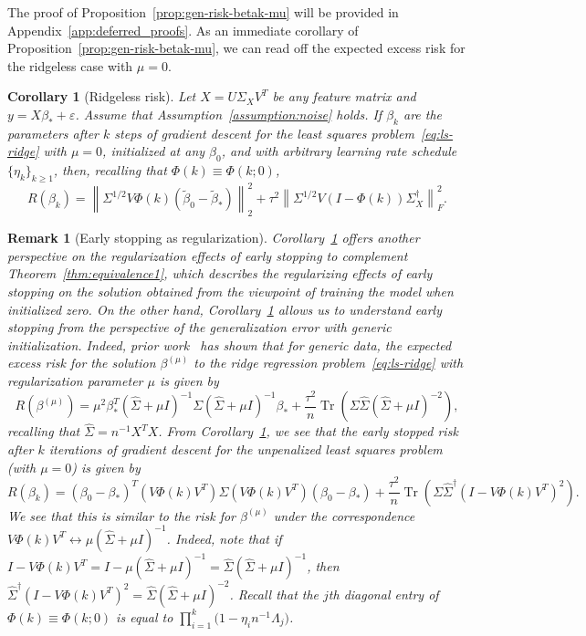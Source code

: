 \documentclass[11pt]{article}
\newtheorem{corollary}{Corollary}
\newtheorem{remark}{Remark}
\DeclareMathOperator{\Tr}{Tr}
\begin{document}
The proof of Proposition~\ref{prop:gen-risk-betak-mu} will be provided in Appendix~\ref{app:deferred_proofs}.
As an immediate corollary of Proposition~\ref{prop:gen-risk-betak-mu}, we can read off the expected excess risk for the ridgeless case with $\mu = 0$.

\begin{corollary}[Ridgeless risk] \label{cor:gen-risk-betak}
Let $X = U \Sigma_X V^T$ be any feature matrix and $y = X \beta_* + \varepsilon$. Assume that Assumption~\ref{assumption:noise} holds. If $\beta_k$ are the parameters after $k$ steps of gradient descent for the least squares problem~\eqref{eq:ls-ridge} with $\mu = 0$, initialized at any $\beta_0$, and with arbitrary learning rate schedule $\{ \eta_k\}_{k \geq 1}$, then, recalling that $\Phi(k) \equiv \Phi(k; 0)$,
\[
    R(\beta_k) = \left\|\Sigma^{1/2}V\Phi(k)(\tilde{\beta}_0 - \tilde{\beta}_*)\right\|_2^2 + \tau^2\left\|\Sigma^{1/2}V(I - \Phi(k))\Sigma_X^\dagger \right\|_F^2.
\]
\end{corollary}

\begin{remark}[Early stopping as regularization] Corollary~\ref{cor:gen-risk-betak} offers another perspective on the regularization effects of early stopping to complement Theorem~\ref{thm:equivalence1}, which describes the regularizing effects of early stopping on the solution obtained from the viewpoint of training the model when initialized zero. On the other hand, Corollary~\ref{cor:gen-risk-betak} allows us to understand early stopping from the perspective of the generalization error with generic initialization. Indeed, prior work~\cite{DobribanWager2018, cheng2024dimension} has shown that for generic data, the expected excess risk for the solution $\beta^{(\mu)}$ to the ridge regression problem~\eqref{eq:ls-ridge} with regularization parameter $\mu$ is given by 
\[
    R(\beta^{(\mu)}) = \mu^2 \beta_*^T(\hat{\Sigma} + \mu I)^{-1}\Sigma (\hat{\Sigma} + \mu I)^{-1} \beta_* + \frac{\tau^2}{n}\Tr\left(\Sigma \hat{\Sigma} (\hat{\Sigma} + \mu I)^{-2}\right),
\]
recalling that $\hat{\Sigma} = n^{-1} X^T X$.
From Corollary~\ref{cor:gen-risk-betak}, we see that the early stopped risk after $k$ iterations of gradient descent for the unpenalized least squares problem (with $\mu = 0$) is given by 
\[
    R(\beta_k) = (\beta_0 - \beta_*)^T(V\Phi(k)V^T) \Sigma (V\Phi(k)V^T) (\beta_0 - \beta_*) + \frac{\tau^2}{n} \Tr\left(\Sigma \hat{\Sigma}^{\dagger} (I - V\Phi(k)V^T)^2 \right).
\]
We see that this is similar to the risk for $\beta^{(\mu)}$ under the correspondence $V\Phi(k)V^T \leftrightarrow \mu(\hat{\Sigma}+\mu I)^{-1}$. Indeed, note that if $I - V \Phi(k) V^T = I - \mu (\hat{\Sigma} + \mu I)^{-1} = \hat{\Sigma}(\hat{\Sigma} + \mu I)^{-1}$, then $\hat{\Sigma}^{\dagger} (I - V \Phi(k) V^T)^2 = \hat{\Sigma} (\hat{\Sigma} + \mu I)^{-2}$. Recall that the $j$th diagonal entry of $\Phi(k) \equiv \Phi(k; 0)$ is equal to $\prod_{i=1}^k \bigl( 1 - \eta_i n^{-1} \Lambda_j \bigr)$.
\end{remark}
\end{document}
